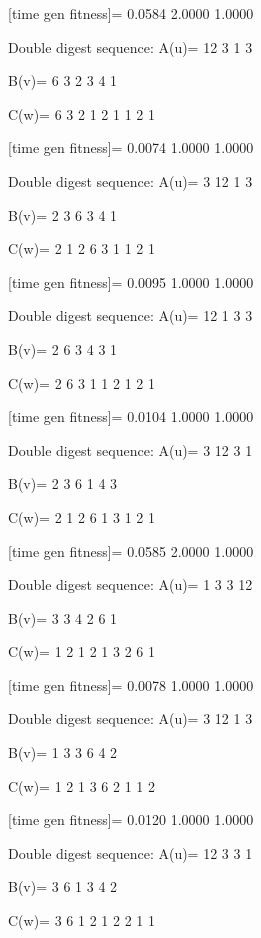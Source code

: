 [time gen fitness]=
    0.0584    2.0000    1.0000

Double digest sequence:
A(u)=
    12     3     1     3

B(v)=
     6     3     2     3     4     1

C(w)=
     6     3     2     1     2     1     1     2     1

[time gen fitness]=
    0.0074    1.0000    1.0000

Double digest sequence:
A(u)=
     3    12     1     3

B(v)=
     2     3     6     3     4     1

C(w)=
     2     1     2     6     3     1     1     2     1

[time gen fitness]=
    0.0095    1.0000    1.0000

Double digest sequence:
A(u)=
    12     1     3     3

B(v)=
     2     6     3     4     3     1

C(w)=
     2     6     3     1     1     2     1     2     1

[time gen fitness]=
    0.0104    1.0000    1.0000

Double digest sequence:
A(u)=
     3    12     3     1

B(v)=
     2     3     6     1     4     3

C(w)=
     2     1     2     6     1     3     1     2     1

[time gen fitness]=
    0.0585    2.0000    1.0000

Double digest sequence:
A(u)=
     1     3     3    12

B(v)=
     3     3     4     2     6     1

C(w)=
     1     2     1     2     1     3     2     6     1

[time gen fitness]=
    0.0078    1.0000    1.0000

Double digest sequence:
A(u)=
     3    12     1     3

B(v)=
     1     3     3     6     4     2

C(w)=
     1     2     1     3     6     2     1     1     2

[time gen fitness]=
    0.0120    1.0000    1.0000

Double digest sequence:
A(u)=
    12     3     3     1

B(v)=
     3     6     1     3     4     2

C(w)=
     3     6     1     2     1     2     2     1     1

